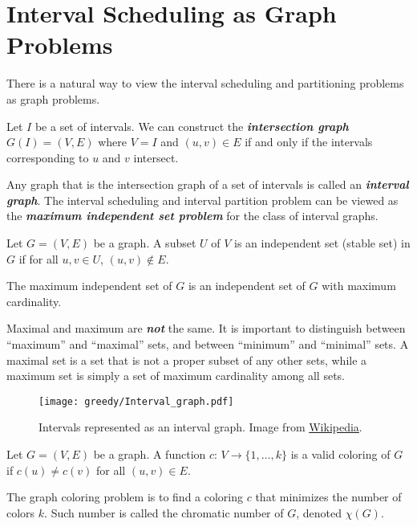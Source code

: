 \section{Interval Scheduling as Graph Problems}

There is a natural way to view the interval scheduling and partitioning problems as graph problems.

 
Let $I$ be a set of intervals. We can construct the \textit{\textbf{intersection graph}} $G(I) = (V,E)$ where $V=I$ and $(u,v) \in E$ if and only if the intervals corresponding to $u$ and $v$ intersect.

Any graph that is the intersection graph of a set of intervals is called an \textit{\textbf{interval graph}}. The interval scheduling and interval partition problem can be viewed as the \textit{\textbf{maximum independent set problem}} for the class of interval graphs.

\begin{definition}
    Let $G=(V,E)$ be a graph. A subset $U$ of $V$ is an independent set (stable set) in $G$ if for all $u,v \in U$, $(u,v) \not\in E$.

    The maximum independent set of $G$ is an independent set of $G$ with maximum cardinality.
\end{definition}

\begin{pitfall}
    Maximal and maximum are \textit{\textbf{not}} the same. It is important to distinguish between ``maximum'' and ``maximal'' sets, and between ``minimum'' and ``minimal'' sets. A maximal set is a set that is not a proper subset of any other sets, while a maximum set is simply a set of maximum cardinality among all sets.
\end{pitfall}

\begin{figure}[htbp]
    \centering
    \texttt{[image: greedy/Interval\_graph.pdf]}
    \caption{Intervals represented as an interval graph. Image from \href{https://en.wikipedia.org/wiki/Interval_graph}{Wikipedia}.}
    \label{fig:greedy-interval-graph}
\end{figure}

\begin{definition}
    Let $G=(V,E)$ be a graph. A function $c:\, V \to \{1,\ldots,k\}$ is a valid coloring of $G$ if $c(u) \neq c(v)$ for all $(u,v) \in E$.

    The graph coloring problem is to find a coloring $c$ that minimizes the number of colors $k$. Such number is called the chromatic number of $G$, denoted $\chi(G)$.
\end{definition}

